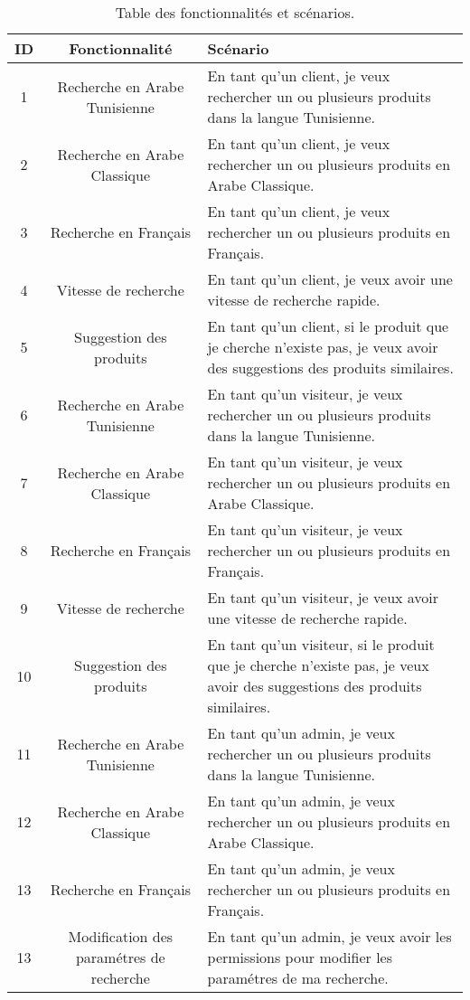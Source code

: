\begin{table}[H]
\centering
\begin{tabular}{|c|c|p{10cm}|}
\hline
\rowcolor{blue!20}
\textbf{ID} & \textbf{Fonctionnalité} & \textbf{Scénario} \\ \hline
1 & Recherche en Arabe Tunisienne  & En tant qu'un client, je veux rechercher un ou plusieurs produits dans la langue Tunisienne. \\ \hline
2 & Recherche en Arabe Classique & En tant qu'un client, je veux rechercher un ou plusieurs produits en Arabe Classique. \\ \hline
3 & Recherche en Français & En tant qu'un client, je veux rechercher un ou plusieurs produits en Français. \\ \hline
4 & Vitesse de recherche & En tant qu'un client, je veux avoir une vitesse de recherche rapide. \\ \hline
5 & Suggestion des produits & En tant qu'un client, si le produit que je cherche n'existe pas, je veux avoir des suggestions des produits similaires. \\ \hline
6 & Recherche en Arabe Tunisienne  & En tant qu'un visiteur, je veux rechercher un ou plusieurs produits dans la langue Tunisienne. \\ \hline
7 & Recherche en Arabe Classique & En tant qu'un visiteur, je veux rechercher un ou plusieurs produits en Arabe Classique. \\ \hline
8 & Recherche en Français & En tant qu'un visiteur, je veux rechercher un ou plusieurs produits en Français. \\ \hline
9 & Vitesse de recherche & En tant qu'un visiteur, je veux avoir une vitesse de recherche rapide. \\ \hline
10 & Suggestion des produits & En tant qu'un visiteur, si le produit que je cherche n'existe pas, je veux avoir des suggestions des produits similaires. \\ \hline
11 & Recherche en Arabe Tunisienne  & En tant qu'un admin, je veux rechercher un ou plusieurs produits dans la langue Tunisienne. \\ \hline
12 & Recherche en Arabe Classique & En tant qu'un admin, je veux rechercher un ou plusieurs produits en Arabe Classique. \\ \hline
13 & Recherche en Français & En tant qu'un admin, je veux rechercher un ou plusieurs produits en Français. \\ \hline
13 & Modification des paramétres de recherche & En tant qu'un admin, je veux avoir les permissions pour modifier les paramétres de ma recherche. \\ \hline
\end{tabular}
\caption{Table des fonctionnalités et scénarios.}
\end{table}
